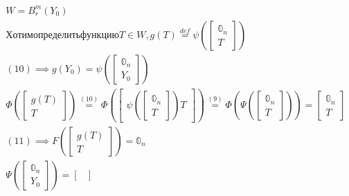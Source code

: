 \documentclass[main]{subfiles}
\begin{document}
\begin{longProof}
            \begin{gather*}
              W = B_r^m(Y_0) \\
             Хотим определить функцию 
             T \in W, g(T) \stackrel{def}{=} \psi\left(\begin{bmatrix*}
               \mathbb{0}_n \\
               T               
             \end{bmatrix*}\right) \tag{10} \\
             (10) \implies g(Y_0) = \psi\left(\begin{bmatrix*}
               \mathbb{0}_n \\
               Y_0   
             \end{bmatrix*}\right) \\
             \Phi\left(\begin{bmatrix*}
                  g(T) \\
                  T
             \end{bmatrix*}\right) \stackrel{(10)}{=} \Phi\left(\begin{bmatrix*}
               \psi\left(\begin{bmatrix*}
                  \mathbb{0}_n \\
                  T
               \end{bmatrix*}\right)
               T
             \end{bmatrix*}\right) \stackrel{(9)}{=} \Phi \left( \Psi\left(\begin{bmatrix*}
               \mathbb{0}_n \\
               T
             \end{bmatrix*}\right) \right)  = \begin{bmatrix*}
               \mathbb{0}_n \\
               T
             \end{bmatrix*} \tag{11} \\
             (11) \implies F\left(\begin{bmatrix*}
               g(T) \\
               T
             \end{bmatrix*}\right) = \mathbb{0}_n \tag{12} \\
             \Psi\left(\begin{bmatrix*}
                  \mathbb{0}_n \\
                  Y_0
             \end{bmatrix*}\right) = \begin{bmatrix*}

\end{bmatrix*}
\end{gather*}
\end{longProof}
\end{document}
